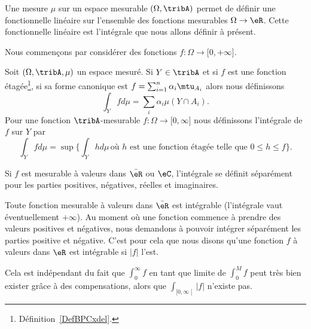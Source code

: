 Une mesure \( \mu\) sur un espace mesurable \( (\Omega,\tribA)\) permet de définir une fonctionnelle linéaire sur l'ensemble des fonctions mesurables \( \Omega\to \eR\). Cette fonctionnelle linéaire est l'intégrale que nous allons définir à présent.

Nous commençons par considérer des fonctions \( f\colon \Omega\to \mathopen[ 0 , +\infty \mathclose]\).

\begin{definition}  \label{DefTVOooleEst}
    Soit \( (\Omega,\tribA,\mu)\) un espace mesuré. Si \( Y\in \tribA\) et si \( f\) est une fonction étagée\footnote{Définition~\ref{DefBPCxdel}.}, si sa forme canonique est \( f=\sum_{i=1}^n\alpha_i\mtu_{A_i}\) alors nous définissons
    \begin{equation}        \label{EqooGAFMooZLzjPs}
        \int_Yfd\mu=\sum_i\alpha_i\mu(Y\cap A_i).
    \end{equation}
    Pour une fonction \( \tribA\)-mesurable \( f\colon \Omega\to \mathopen[ 0 , \infty \mathclose]\) nous définissons l'intégrale de \( f\) sur \( Y\) par
    \begin{equation}        \label{EqDefintYfdmu}
        \int_Yfd\mu=\sup\Big\{ \int_Yhd\mu\,\text{où } h\text{ est une fonction étagée telle que } 0\leq h\leq f \Big\}.
    \end{equation}

    Si $f$ est mesurable à valeurs dans \( \bar \eR\) ou \( \eC\), l'intégrale se définit séparément pour les parties positives, négatives, réelles et imaginaires.
\end{definition}

\begin{remark}
    Toute fonction mesurable à valeurs dans \( \bar \eR\) est intégrable (l'intégrale vaut éventuellement \( +\infty\)). Au moment où une fonction commence à prendre des valeurs positives et négatives, nous demandons à pouvoir intégrer séparément les parties positive et négative. C'est pour cela que nous disons qu'une fonction \( f\) à valeurs dans \( \eR\) est intégrable si \( | f |\) l'est.

    Cela est indépendant du fait que \( \int_0^{\infty}f\) en tant que limite de \( \int_0^{M}f\) peut très bien exister grâce à des compensations, alors que \( \int_{\mathopen[ 0 , \infty \mathclose[}| f |\) n'existe pas.
\end{remark}

